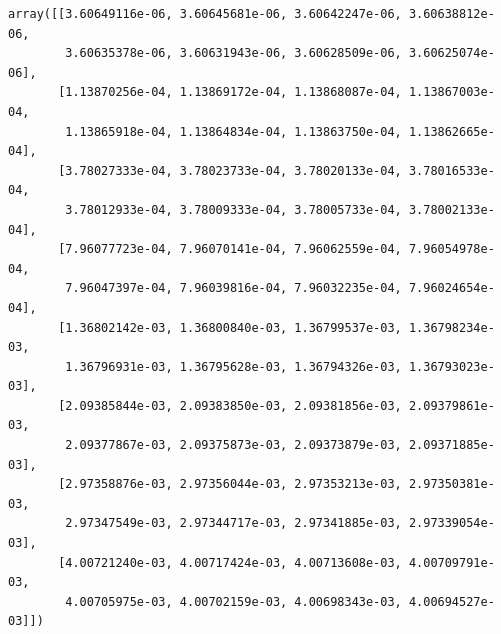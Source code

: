 \documentclass[11pt]{article}
\makeatletter
\newcommand{\boxspacing}{\kern\kvtcb@left@rule\kern\kvtcb@boxsep}
\newcommand{\prompt}[4]{
        {\ttfamily\llap{{\color{#2}[#3]:\hspace{3pt}#4}}\vspace{-\baselineskip}}
    }
\makeatother
\begin{document}
            \begin{tcolorbox}[breakable, size=fbox, boxrule=.5pt, pad at break*=1mm, opacityfill=0]
\prompt{Out}{outcolor}{32}{\boxspacing}
\begin{Verbatim}[commandchars=\\\{\}]
array([[3.60649116e-06, 3.60645681e-06, 3.60642247e-06, 3.60638812e-06,
        3.60635378e-06, 3.60631943e-06, 3.60628509e-06, 3.60625074e-06],
       [1.13870256e-04, 1.13869172e-04, 1.13868087e-04, 1.13867003e-04,
        1.13865918e-04, 1.13864834e-04, 1.13863750e-04, 1.13862665e-04],
       [3.78027333e-04, 3.78023733e-04, 3.78020133e-04, 3.78016533e-04,
        3.78012933e-04, 3.78009333e-04, 3.78005733e-04, 3.78002133e-04],
       [7.96077723e-04, 7.96070141e-04, 7.96062559e-04, 7.96054978e-04,
        7.96047397e-04, 7.96039816e-04, 7.96032235e-04, 7.96024654e-04],
       [1.36802142e-03, 1.36800840e-03, 1.36799537e-03, 1.36798234e-03,
        1.36796931e-03, 1.36795628e-03, 1.36794326e-03, 1.36793023e-03],
       [2.09385844e-03, 2.09383850e-03, 2.09381856e-03, 2.09379861e-03,
        2.09377867e-03, 2.09375873e-03, 2.09373879e-03, 2.09371885e-03],
       [2.97358876e-03, 2.97356044e-03, 2.97353213e-03, 2.97350381e-03,
        2.97347549e-03, 2.97344717e-03, 2.97341885e-03, 2.97339054e-03],
       [4.00721240e-03, 4.00717424e-03, 4.00713608e-03, 4.00709791e-03,
        4.00705975e-03, 4.00702159e-03, 4.00698343e-03, 4.00694527e-03]])
\end{Verbatim}
\end{tcolorbox}
        
\end{document}
